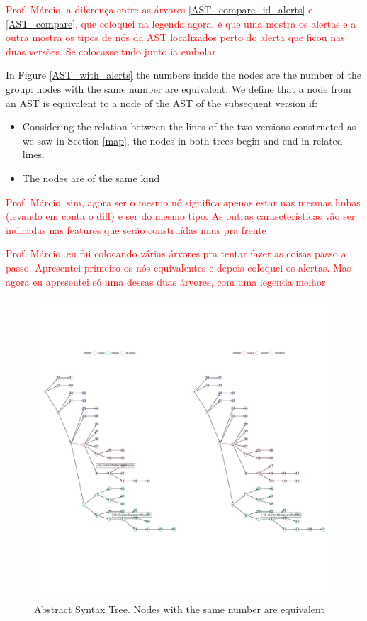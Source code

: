 \documentclass[
]{article}
\begin{document}
\normalsize

\textcolor{red}{Prof. Márcio, a diferença entre as árvores \ref{AST_compare_id_alerts} e \ref{AST_compare}, que coloquei na legenda agora, é que uma mostra os alertas e a outra mostra os tipos de nós da AST localizados perto do alerta que ficou nas duas versões. Se colocasse tudo junto ia embolar }

In Figure \ref{AST_with_alerts} the numbers inside the nodes are the
number of the group: nodes with the same number are equivalent. We
define that a node from an AST is equivalent to a node of the AST of the
subsequent version if:

\begin{itemize}
\item
  Considering the relation between the lines of the two versions
  constructed as we saw in Section \ref{map}, the nodes in both trees
  begin and end in related lines.
\item
  The nodes are of the same kind
\end{itemize}

\textcolor{red}{Prof. Márcio, sim, agora ser o mesmo nó significa apenas estar nas mesmas linhas (levando em conta o diff) e ser do mesmo tipo. As outras carascterísticas vão ser indicadas nas features que serão construídas mais pra frente}

\textcolor{red}{Prof. Márcio, eu fui colocando várias árvores pra tentar fazer as coisas passo a passo. Apresentei primeiro os nós equivalentes e depois coloquei os alertas. Mas agora eu apresentei só uma dessas duas árvores, com uma legenda melhor }

\small

\begin{figure}[H]
\includegraphics[width=1\linewidth]{report_files/figure-latex/unnamed-chunk-4-1} \caption{Abstract Syntax Tree. Nodes with the same number are equivalent \label{AST_with_alerts}}\label{fig:unnamed-chunk-4}
\end{figure}
\end{document}
